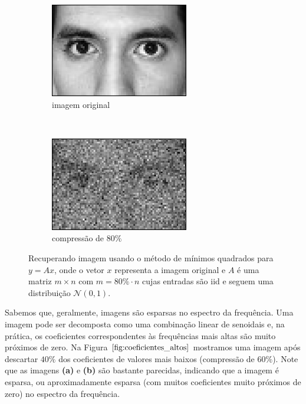 \begin{figure}
\centering
	\begin{subfigure}[b]{0.4\textwidth}
        \centering
        \includegraphics[scale=1]{imagens/homotopy/original.png}
        \caption{imagem original}
    \end{subfigure}
    ~
    \begin{subfigure}[b]{0.4\textwidth}
        \centering
        \includegraphics[scale=1]{imagens/homotopy/80porcentoMMQ.png}
        \caption{compressão de $80\%$}
    \end{subfigure}
    \caption{Recuperando imagem usando o método de mínimos quadrados para $y = Ax$, onde o vetor $x$ representa a imagem original e $A$ é uma matriz $m \times n$ com $m = 80 \% \cdot n$ cujas entradas são iid e seguem uma distribuição $\mathcal{N}(0,1)$.}
    \label{fig:mmq} %
\end{figure}

Sabemos que, geralmente, imagens são esparsas no espectro da frequência. Uma imagem pode ser decomposta como uma combinação linear de senoidais e, na prática, os coeficientes correspondentes às frequências mais altas são muito próximos de zero. Na Figura $\ref{fig:coeficientes_altos}$ mostramos uma imagem após descartar $40\%$ dos coeficientes de valores mais baixos (compressão de $60\%$). Note que as imagens {\bf (a)} e {\bf (b)} são bastante parecidas, indicando que a imagem é esparsa, ou aproximadamente esparsa (com muitos coeficientes muito próximos de zero) no espectro da frequência. 

